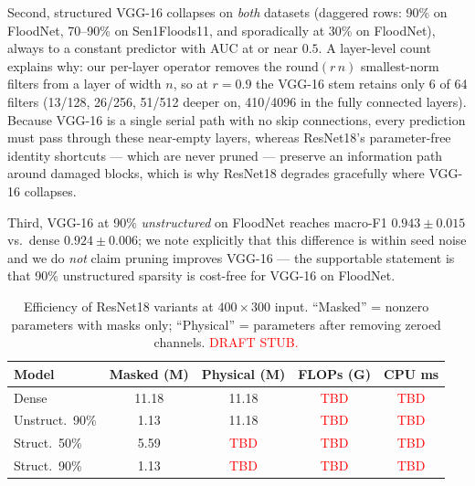 \documentclass[conference]{IEEEtran}
\newcommand{\TBD}{\textcolor{red}{TBD}}
\newif\ifreview
\newcommand{\REV}[1]{\ifreview\textcolor{red}{\textbf{[Revise: #1]}}\fi}
\begin{document}
Second, structured VGG-16 collapses on \emph{both} datasets (daggered
rows: 90\% on FloodNet, 70--90\% on Sen1Floods11, and sporadically at
30\% on FloodNet), always to a constant predictor with AUC at or near
$0.5$. A layer-level count explains why: our per-layer operator removes
the $\mathrm{round}(r\,n)$ smallest-norm filters from a layer of width
$n$, so at $r=0.9$ the VGG-16 stem retains only 6 of 64 filters
(13/128, 26/256, 51/512 deeper on, 410/4096 in the fully connected
layers). Because VGG-16 is a single serial path with no skip
connections, every prediction must pass through these near-empty
layers, whereas ResNet18's parameter-free identity shortcuts --- which
are never pruned --- preserve an information path around damaged
blocks, which is why ResNet18 degrades gracefully where VGG-16
collapses.
\REV{[A12] (i) ``always to a constant predictor with AUC at or near
0.5'' contradicts the table (FloodNet struct.\ 30\%: AUC .737; lr-control
AUC .922) -- fix wording. (ii) Layer counts are verified (round(0.1n)
gives 6/13/26/51/410) -- good. (iii) The skip-connection explanation is
a \emph{hypothesis}: VGG-16 also has no BatchNorm and a huge FC head
(4096 units pruned to 410). Write ``consistent with'' not ``which is
why'', or add a quick ablation (e.g., exclude the FC layers from
structured pruning, or prune VGG-16-BN).}

Third, VGG-16 at 90\% \emph{unstructured} on FloodNet reaches
macro-F1 $0.943\pm0.015$ vs.\ dense $0.924\pm0.006$; we note explicitly
that this difference is within seed noise and we do \emph{not} claim
pruning improves VGG-16 --- the supportable statement is that 90\%
unstructured sparsity is cost-free for VGG-16 on FloodNet.

\begin{table}[t]
\centering
\caption{Efficiency of ResNet18 variants at $400{\times}300$ input.
``Masked'' = nonzero parameters with masks only; ``Physical'' =
parameters after removing zeroed channels. \textcolor{red}{DRAFT STUB.}}
\label{tab:eff}
\footnotesize
\setlength{\tabcolsep}{3pt}
\begin{tabular}{lcccc}
\toprule
\textbf{Model} & \textbf{Masked (M)} & \textbf{Physical (M)} & \textbf{FLOPs (G)} & \textbf{CPU ms}\\
\midrule
Dense & 11.18 & 11.18 & \TBD & \TBD\\
Unstruct.\ 90\% & 1.13 & 11.18 & \TBD & \TBD\\
Struct.\ 50\% & 5.59 & \TBD & \TBD & \TBD\\
Struct.\ 90\% & 1.13 & \TBD & \TBD & \TBD\\
\bottomrule
\end{tabular}
\end{table}
\REV{[B6] The paper is motivated by edge deployment but reports no
efficiency numbers. Fill this stub: physically remove masked channels
(e.g., with torch-pruning) or at least compute effective params/FLOPs
analytically (fvcore/thop); optionally CPU latency (batch 1, 100 runs,
state CPU model). This also resolves A11(b) and lets you say something
useful like ``structured 50\% actually gives $\sim$4$\times$ fewer
parameters, yet costs 6.7 macro-F1 points on SAR''. If you cannot
finish, delete the table and keep the limitation paragraph.}
\end{document}
